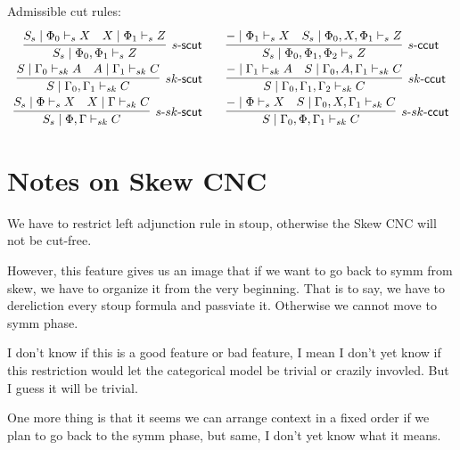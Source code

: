 \documentclass{article}
\newcommand{\td}{\text{-}}
\newcommand{\scut}{\mathsf{scut}}
\newcommand{\ccut}{\mathsf{ccut}}
\begin{document}
 Admissible cut rules:
 \begin{displaymath}
   \begin{array}{cc}
     \infer[s\td\scut]{S_{s} \mid \Phi_{0} , \Phi_{1} \vdash_{s} Z}{
      \deduce{S_{s} \mid \Phi_{0} \vdash_{s} X}{}
      &
      \deduce{X \mid \Phi_{1} \vdash_{s} Z}{}
     }
     \qquad
     \infer[s\td\ccut]{S_{s} \mid \Phi_{0} , \Phi_{1} , \Phi_{2} \vdash_{s} Z}{
      \deduce{- \mid \Phi_{1} \vdash_{s} X}{}
      &
      \deduce{S_{s} \mid \Phi_{0} , X , \Phi_{1} \vdash_{s} Z}{}
      }
      \\
      \infer[sk\td\scut]{S \mid \Gamma_{0} , \Gamma_{1} \vdash_{sk} C}{
       \deduce{S \mid \Gamma_{0} \vdash_{sk} A}{}
       &
       \deduce{A \mid \Gamma_{1} \vdash_{sk} C}{}
      }
      \qquad
      \infer[sk\td\ccut]{S \mid \Gamma_{0} , \Gamma_{1} , \Gamma_{2} \vdash_{sk} C}{
       \deduce{- \mid \Gamma_{1} \vdash_{sk} A}{}
       &
       \deduce{S \mid \Gamma_{0} , A , \Gamma_{1} \vdash_{sk} C}{}
     }
     \\
     \infer[s\td sk \td\scut]{S_{s} \mid \Phi , \Gamma \vdash_{sk} C}{
      \deduce{S_{s} \mid \Phi \vdash_{s} X}{}
      &
      \deduce{X \mid \Gamma \vdash_{sk} C}{}
     }
     \qquad
     \infer[s\td sk\td\ccut]{S \mid \Gamma_{0} , \Phi , \Gamma_{1} \vdash_{sk} C}{
      \deduce{- \mid \Phi \vdash_{s} X}{}
      &
      \deduce{S \mid \Gamma_{0} , X , \Gamma_{1} \vdash_{sk} C}{}
     }
   \end{array}
 \end{displaymath}
 \section*{Notes on Skew CNC}
 We have to restrict left adjunction rule in stoup, otherwise the Skew CNC will not be cut-free.

However, this feature gives us an image that if we want to go back to symm from skew, we have to organize it from the very beginning. That is to say, we have to dereliction every stoup formula and passviate it. Otherwise we cannot move to symm phase.

I don’t know if this is a good feature or bad feature, I mean I don’t yet know if this restriction would let the categorical model be trivial or crazily invovled. But I guess it will be trivial.

One more thing is that it seems we can arrange context in a fixed order if we plan to go back to the symm phase, but same, I don’t yet know what it means.
\end{document}
